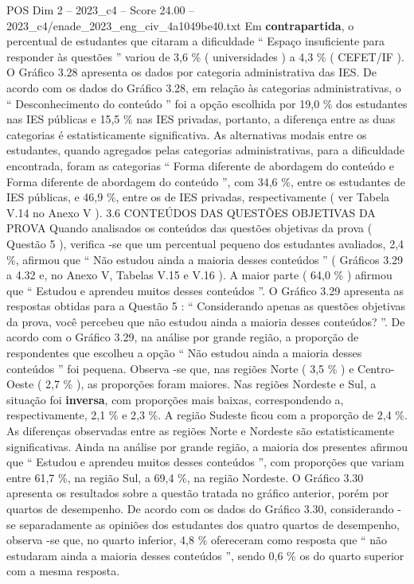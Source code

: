 \begin{textsample}{POS Dim 2 – 2023\_c4 – Score 24.00 – 2023\_c4/enade\_2023\_eng\_civ\_4a1049be40.txt}
Em \textbf{contrapartida}, o percentual de estudantes que citaram a dificuldade “ Espaço insuficiente para responder às questões ” variou de 3,6 \% ( universidades ) a 4,3 \% ( CEFET/IF ).
O Gráfico 3.28 apresenta os dados por categoria administrativa das IES.
De acordo com os dados do Gráfico 3.28, em relação às categorias administrativas, o “ Desconhecimento do conteúdo ” foi a opção escolhida por 19,0 \% dos estudantes nas IES públicas e 15,5 \% nas IES privadas, portanto, a diferença entre as duas categorias é estatisticamente significativa.
As alternativas modais entre os estudantes, quando agregados pelas categorias administrativas, para a dificuldade encontrada, foram as categorias “ Forma diferente de abordagem do conteúdo e Forma diferente de abordagem do conteúdo ”, com 34,6 \%, entre os estudantes de IES públicas, e 46,9 \%, entre os de IES privadas, respectivamente ( ver Tabela V.14 no Anexo V ). 3.6 CONTEÚDOS DAS QUESTÕES OBJETIVAS DA PROVA Quando analisados os conteúdos das questões objetivas da prova ( Questão 5 ), verifica -se que um percentual pequeno dos estudantes avaliados, 2,4 \%, afirmou que “ Não estudou ainda a maioria desses conteúdos ” ( Gráficos 3.29 a 4.32 e, no Anexo V, Tabelas V.15 e V.16 ).
A maior parte ( 64,0 \% ) afirmou que “ Estudou e aprendeu muitos desses conteúdos ”.
O Gráfico 3.29 apresenta as respostas obtidas para a Questão 5 : “ Considerando apenas as questões objetivas da prova, você percebeu que não estudou ainda a maioria desses conteúdos? ”.
De acordo com o Gráfico 3.29, na análise por grande região, a proporção de respondentes que escolheu a opção “ Não estudou ainda a maioria desses conteúdos ” foi pequena.
Observa -se que, nas regiões Norte ( 3,5 \% ) e Centro-Oeste ( 2,7 \% ), as proporções foram maiores.
Nas regiões Nordeste e Sul, a situação foi \textbf{inversa}, com proporções mais baixas, correspondendo a, respectivamente, 2,1 \% e 2,3 \%.
A região Sudeste ficou com a proporção de 2,4 \%.
As diferenças observadas entre as regiões Norte e Nordeste são estatisticamente significativas.
Ainda na análise por grande região, a maioria dos presentes afirmou que “ Estudou e aprendeu muitos desses conteúdos ”, com proporções que variam entre 61,7 \%, na região Sul, a 69,4 \%, na região Nordeste.
O Gráfico 3.30 apresenta os resultados sobre a questão tratada no gráfico anterior, porém por quartos de desempenho.
De acordo com os dados do Gráfico 3.30, considerando -se separadamente as opiniões dos estudantes dos quatro quartos de desempenho, observa -se que, no quarto inferior, 4,8 \% ofereceram como resposta que “ não estudaram ainda a maioria desses conteúdos ”, sendo 0,6 \% os do quarto superior com a mesma resposta.

\end{textsample}
